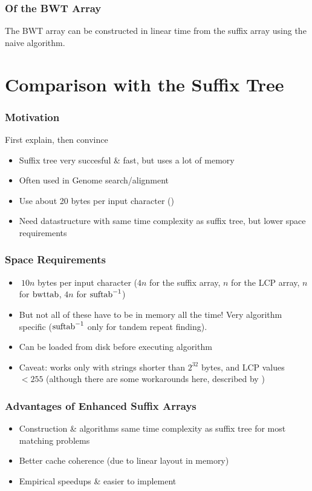 \documentclass[compress,handout]{beamer} %
\begin{document}
\begin{frame}
	\frametitle{Of the BWT Array}
	The BWT array can be constructed in linear time from the suffix
	array using the naive algorithm.
\end{frame}

\section{Comparison with the Suffix Tree}

\begin{frame}
	\frametitle{Motivation}
	First explain, then convince

	\begin{itemize}
		\item Suffix tree very succesful \& fast, but uses a lot of memory
		\item Often used in Genome search/alignment
		\item Use about 20 bytes per input character (\cite{kurtz1999reducing})
		\item Need datastructure with same time complexity as suffix tree, but lower space requirements
	\end{itemize}
\end{frame}

\begin{frame}
	\frametitle{Space Requirements}
	\begin{itemize}
		\item $~10n$ bytes per input character ($4n$ for the suffix array, $n$ for the LCP array, $n$ for $\hbox{bwttab}$, $4n$ for $\hbox{suftab}^{-1}$)
		\item But not all of these have to be in memory all the time! Very algorithm specific ($\hbox{suftab}^{-1}$ only for tandem repeat finding).
		\item Can be loaded from disk before executing algorithm
		\item Caveat: works only with strings shorter than $2^{32}$ bytes, and LCP values $<255$ (although there are some workarounds here, described by \cite{abouelhoda2004replacing})
	\end{itemize}
\end{frame}

\begin{frame}
	\frametitle{Advantages of Enhanced Suffix Arrays}
	\begin{itemize}
		\item Construction \& algorithms same time complexity as suffix tree for most matching problems
		\item Better cache coherence (due to linear layout in memory)
		\item Empirical speedups \& easier to implement
	\end{itemize}
\end{frame}
\end{document}
